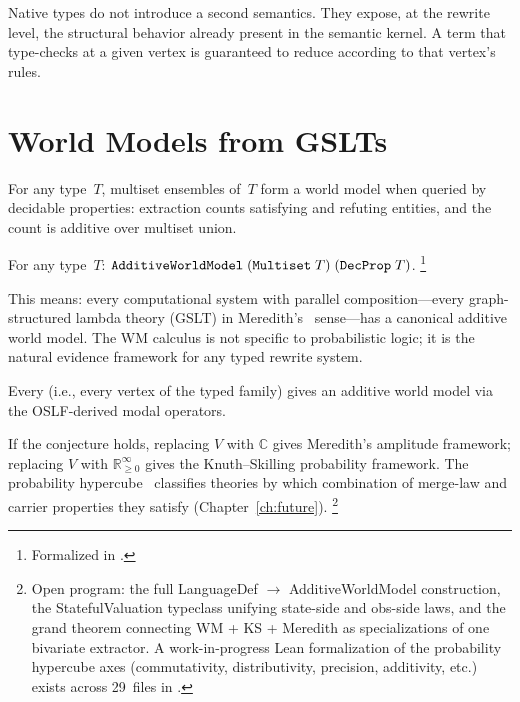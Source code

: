 \documentclass[11pt,openany]{report}
\begin{document}
Native types do not introduce a second semantics.  They expose, at
the rewrite level, the structural behavior already present in the
semantic kernel.  A term that type-checks at a given vertex is
guaranteed to reduce according to that vertex's rules.


\section{World Models from GSLTs}
\label{sec:gslt-open-program}

For any type~$T$, multiset ensembles of~$T$ form a world model when
queried by decidable properties: extraction counts satisfying and
refuting entities, and the count is additive over multiset union.

\begin{theorem}
\label{thm:universalEnsembleWorldModel}
For any type~$T$:
$\texttt{AdditiveWorldModel}\;(\texttt{Multiset}\;T)\;(\texttt{DecProp}\;T)$.%
\footnote{Formalized in
.}
\end{theorem}

\noindent
This means: every computational system with parallel composition---every
graph-structured lambda theory (GSLT) in
Meredith's~\cite{meredith2026ccc} sense---has a canonical additive
world model.  The WM calculus is not specific to probabilistic
logic; it is the natural evidence framework for any typed rewrite
system.

\begin{conjecture}
\label{conj:langdef-universality}
Every  (i.e., every vertex of the typed family)
gives an additive world model via the OSLF-derived modal operators.
\end{conjecture}

\noindent
If the conjecture holds, replacing $V$ with $\mathbb{C}$ gives
Meredith's amplitude framework; replacing $V$ with
$\mathbb{R}_{\ge 0}^\infty$ gives the Knuth--Skilling probability
framework.  The probability
hypercube~\cite{StayWells2026} classifies theories by which
combination of merge-law and carrier properties they satisfy
(Chapter~\ref{ch:future}).%
\footnote{Open program: the full LanguageDef $\to$ AdditiveWorldModel
construction, the StatefulValuation typeclass unifying state-side and
obs-side laws, and the grand theorem connecting WM + KS + Meredith as
specializations of one bivariate extractor.  A work-in-progress Lean formalization
of the probability hypercube axes (commutativity, distributivity,
precision, additivity, etc.) exists across 29~files in
.}
\end{document}
